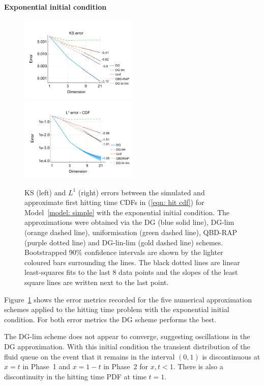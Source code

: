 \paragraph{Exponential initial condition}
\begin{figure}[h]
	\centering
	\includegraphics[width=0.5\textwidth,trim={0.75cm 0.8cm 0.25cm 1.25cm},clip]{chapter6/figs/hitting_times_model/hitting_times/exp/ks_error_formatted.pdf}%
	\includegraphics[width=0.5\textwidth,trim={0.75cm 0.8cm 0.25cm 1.25cm},clip]{chapter6/figs/hitting_times_model/hitting_times/exp/l1_cdf_error_formatted.pdf}
	\caption{KS (left) and \(L^1\) (right) errors between the simulated and approximate first hitting time CDFs in (\ref{eqn: hit cdf}) for Model~\ref{model: simple} with the exponential initial condition. The approximations were obtained via the DG (blue solid line), DG-lim (orange dashed line), uniformisation (green dashed line), QBD-RAP (purple dotted line) and DG-lin-lim (gold dashed line) schemes. Bootstrapped 90\% confidence intervals are shown by the lighter coloured bars surrounding the lines. The black dotted lines are linear least-squares fits to the last 8 data points and the slopes of the least square lines are written next to the last point.}
	\label{fig: hitting time exp} 
\end{figure}
Figure~\ref{fig: hitting time exp} shows the error metrics recorded for the five numerical approximation schemes applied to the hitting time problem with the exponential initial condition. For both error metrics the DG scheme performs the best. 

The DG-lim scheme does not appear to converge, suggesting oscillations in the DG approximation. With this initial condition the transient distribution of the fluid queue on the event that it remains in the interval \((0,1)\) is discontinuous at \(x=t\) in Phase~1 and \(x=1-t\) in Phase~2 for \(x,t<1\). There is also a discontinuity in the hitting time PDF at time \(t=1\). 

